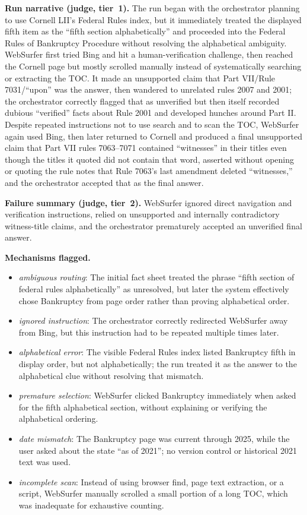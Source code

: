 \textbf{Run narrative (judge, tier~1).} The run began with the orchestrator planning to use Cornell LII's Federal Rules index, but it immediately treated the displayed fifth item as the ``fifth section alphabetically'' and proceeded into the Federal Rules of Bankruptcy Procedure without resolving the alphabetical ambiguity. WebSurfer first tried Bing and hit a human-verification challenge, then reached the Cornell page but mostly scrolled manually instead of systematically searching or extracting the TOC. It made an unsupported claim that Part VII/Rule 7031/``upon'' was the answer, then wandered to unrelated rules 2007 and 2001; the orchestrator correctly flagged that as unverified but then itself recorded dubious ``verified'' facts about Rule 2001 and developed hunches around Part II. Despite repeated instructions not to use search and to scan the TOC, WebSurfer again used Bing, then later returned to Cornell and produced a final unsupported claim that Part VII rules 7063--7071 contained ``witnesses'' in their titles even though the titles it quoted did not contain that word, asserted without opening or quoting the rule notes that Rule 7063's last amendment deleted ``witnesses,'' and the orchestrator accepted that as the final answer.

\textbf{Failure summary (judge, tier~2).} WebSurfer ignored direct navigation and verification instructions, relied on unsupported and internally contradictory witness-title claims, and the orchestrator prematurely accepted an unverified final answer.

\textbf{Mechanisms flagged.}
\begin{itemize}
  \item \emph{ambiguous routing}: The initial fact sheet treated the phrase ``fifth section of federal rules alphabetically'' as unresolved, but later the system effectively chose Bankruptcy from page order rather than proving alphabetical order.
  \item \emph{ignored instruction}: The orchestrator correctly redirected WebSurfer away from Bing, but this instruction had to be repeated multiple times later.
  \item \emph{alphabetical error}: The visible Federal Rules index listed Bankruptcy fifth in display order, but not alphabetically; the run treated it as the answer to the alphabetical clue without resolving that mismatch.
  \item \emph{premature selection}: WebSurfer clicked Bankruptcy immediately when asked for the fifth alphabetical section, without explaining or verifying the alphabetical ordering.
  \item \emph{date mismatch}: The Bankruptcy page was current through 2025, while the user asked about the state ``as of 2021''; no version control or historical 2021 text was used.
  \item \emph{incomplete scan}: Instead of using browser find, page text extraction, or a script, WebSurfer manually scrolled a small portion of a long TOC, which was inadequate for exhaustive counting.
\end{itemize}

